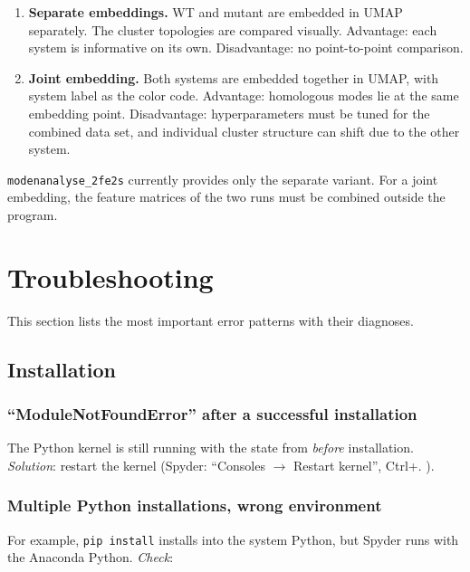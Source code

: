 \documentclass[11pt,a4paper,twoside]{article}
\theoremstyle{remark}
\begin{document}
\begin{enumerate}
  \item \textbf{Separate embeddings.} WT and mutant are embedded in
        UMAP separately. The cluster topologies are compared
        visually. Advantage: each system is informative on its own.
        Disadvantage: no point-to-point comparison.
  \item \textbf{Joint embedding.} Both systems are embedded
        together in UMAP, with system label as the color code.
        Advantage: homologous modes lie at the same embedding
        point. Disadvantage: hyperparameters must be tuned for the
        combined data set, and individual cluster structure can
        shift due to the other system.
\end{enumerate}

\texttt{modenanalyse\_2fe2s} currently provides only the separate
variant. For a joint embedding, the feature matrices of the two
runs must be combined outside the program.


\section{Troubleshooting}
\label{sec:fehlerbehebung}

This section lists the most important error patterns with their
diagnoses.

\subsection{Installation}

\subsubsection*{``ModuleNotFoundError'' after a successful installation}

The Python kernel is still running with the state from \emph{before}
installation. \emph{Solution}: restart the kernel (Spyder:
``Consoles $\to$ Restart kernel'', Ctrl+. ).

\subsubsection*{Multiple Python installations, wrong environment}

For example, \texttt{pip install} installs into the system Python,
but Spyder runs with the Anaconda Python. \emph{Check}:
\end{document}
